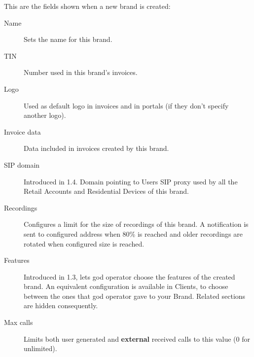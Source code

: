 \documentclass[letterpaper,10pt,english]{sphinxmanual}
\begin{document}
This are the fields shown when a new brand is created:
\begin{description}
\item[{Name}] \leavevmode{}\label{administration_portal/platform/brands:term-name}
Sets the name for this brand.

\item[{TIN}] \leavevmode{}\label{administration_portal/platform/brands:term-tin}
Number used in this brand's invoices.

\item[{Logo}] \leavevmode{}\label{administration_portal/platform/brands:term-logo}
Used as default logo in invoices and in portals (if they don't specify
another logo).

\item[{Invoice data}] \leavevmode{}\label{administration_portal/platform/brands:term-invoice-data}
Data included in invoices created by this brand.

\item[{SIP domain}] \leavevmode{}\label{administration_portal/platform/brands:term-sip-domain}
Introduced in 1.4. Domain pointing to Users SIP proxy used by all the
Retail Accounts and Residential Devices of this brand.

\item[{Recordings}] \leavevmode{}\label{administration_portal/platform/brands:term-recordings}
Configures a limit for the size of recordings of this brand. A
notification is sent to configured address when 80\% is reached and
older recordings are rotated when configured size is reached.

\item[{Features}] \leavevmode{}\label{administration_portal/platform/brands:term-features}
Introduced in 1.3, lets god operator choose the features of the created
brand. An equivalent configuration is available in Clients, to choose
between the ones that god operator gave to your Brand. Related sections
are hidden consequently.

\item[{Max calls}] \leavevmode{}\label{administration_portal/platform/brands:term-max-calls}
Limits both user generated and \textbf{external} received calls to this value
(0 for unlimited).


\end{description}
\end{document}
